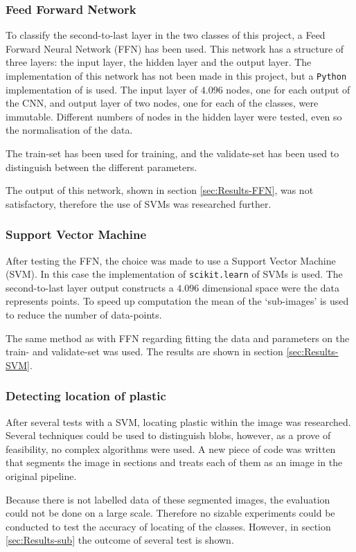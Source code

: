 
\subsubsection{Feed Forward Network}
\label{sec:Method-FFN}
To classify the second-to-last layer in the two classes of this project, a Feed Forward Neural Network (FFN) has been used.
This network has a structure of three layers: the input layer, the hidden layer and the output layer.
The implementation of this network has not been made in this project, but a \texttt{Python} implementation of \citeneed is used.
The input layer of $4.096$ nodes, one for each output of the CNN, and output layer of two nodes, one for each of the classes, were immutable.
Different numbers of nodes in the hidden layer were tested, even so the normalisation of the data.

The train-set has been used for training, and the validate-set has been used to distinguish between the different parameters.

The output of this network, shown in section \ref{sec:Results-FFN}, was not satisfactory, therefore the use of SVMs was researched further.

\subsubsection{Support Vector Machine}
\label{sec:Method-SVM}
After testing the FFN, the choice was made to use a Support Vector Machine (SVM).
In this case the implementation of \texttt{scikit.learn} of SVMs is used.
The second-to-last layer output constructs a $4.096$ dimensional space were the data represents points.
To speed up computation the mean of the `sub-images' is used to reduce the number of data-points.

The same method as with FFN regarding fitting the data and parameters on the train- and validate-set was used.
The results are shown in section \ref{sec:Results-SVM}.

\subsubsection{Detecting location of plastic}
\label{sec:Method-sub}
After several tests with a SVM, locating plastic within the image was researched.
Several techniques could be used to distinguish blobs, however, as a prove of feasibility, no complex algorithms were used.
A new piece of code was written that segments the image in sections and treats each of them as an image in the original pipeline.

Because there is not labelled data of these segmented images, the evaluation could not be done on a large scale.
Therefore no sizable experiments could be conducted to test the accuracy of locating of the classes.
However, in section \ref{sec:Results-sub} the outcome of several test is shown.

\fi